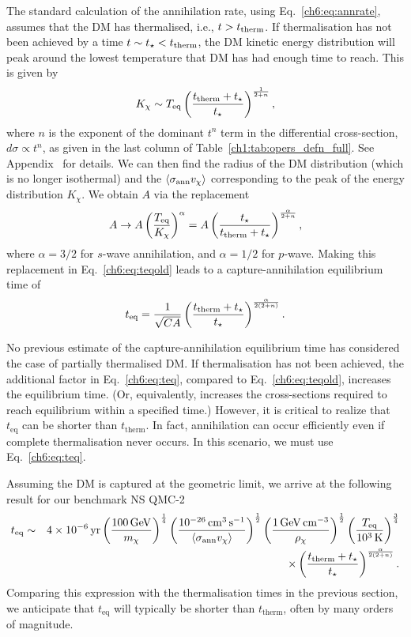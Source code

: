 The standard calculation of the annihilation rate, using Eq.~\ref{ch6:eq:annrate}, assumes that the DM has thermalised, i.e., $t > t_{\rm therm}$. 
If thermalisation has not been achieved by a time $t\sim t_\star<t_{\rm therm}$, the DM kinetic energy distribution will peak around the lowest temperature that DM has had enough time to reach. This is given by 
%
\begin{equation}
K_\chi \sim T_{\rm eq} \left(\frac{t_{\rm therm}+t_\star}{t_\star}\right)^{\frac{1}{2+n}},
\label{ch6:eq:lowtemp} 
\end{equation}
%
where $n$ is the exponent of the dominant $t^n$ term in the differential cross-section, $d\sigma \propto t^n$, as given in the last column of Table~\ref{ch1:tab:opers_defn_full}. See Appendix~ for details. 
We can then find the radius of the DM distribution (which is no longer isothermal) and the $\langle \sigma_{\rm ann} v_\chi \rangle$ corresponding to the peak of the energy distribution $K_\chi$. 
We obtain $A$ via the replacement  
%
\begin{equation}
    A \rightarrow A \left(\frac{T_\text{eq}}{K_\chi}\right)^{\alpha} = 
   A \left(\frac{t_\star}{t_\text{therm}+t_\star}\right)^{\frac{\alpha}{2+n}},  
\end{equation}
%
where $\alpha=3/2$ for $s$-wave annihilation, and $\alpha=1/2$ for $p$-wave. 
Making this replacement in Eq.~\ref{ch6:eq:teqold} leads to a capture-annihilation equilibrium time of
\begin{equation}
 t_{\rm eq} = \frac{1}{\sqrt{C A}} \left(\frac{t_\text{therm}+t_\star}{t_\star}\right)^{\frac{\alpha}{2(2+n)}}. \label{ch6:eq:teq} 
\end{equation}

No previous estimate of the capture-annihilation equilibrium time has considered the case of partially thermalised DM. If thermalisation has not been achieved, the additional factor in Eq.~\ref{ch6:eq:teq}, compared to Eq.~\ref{ch6:eq:teqold}, increases the equilibrium time. (Or, equivalently, increases the cross-sections required to reach equilibrium within a specified time.) However, it is critical to realize that $t_\text{eq}$ can be shorter than $t_\text{therm}$. 
In fact, annihilation can occur efficiently even if complete thermalisation never occurs. In this scenario, we must use Eq.~\ref{ch6:eq:teq}.



Assuming the DM is captured at the geometric limit, we arrive at the following result for our benchmark NS QMC-2
\begin{eqnarray}
    t_{\rm eq}  &\sim&  4\times10^{-6}{\rm \,yr}\left(\frac{100{\rm \,GeV}}{m_\chi}\right)^{\frac{1}{4}}\left(\frac{10^{-26}{\rm \,cm}^3 {\rm \,s}^{-1}}{\langle\sigma_\text{ann} v_\chi\rangle}\right)^{\frac{1}{2}} \left(\frac{1{\rm \,GeV}{\rm \,cm}^{-3}}{\rho_\chi}\right)^{\frac{1}{2}}\left(\frac{T_{\rm eq}}{10^3{\rm \,K}}\right)^{\frac{3}{4}} 
    \nonumber \\ &&\times
    \left(\frac{t_{\rm therm}+t_\star}{t_\star}\right)^{\frac{\alpha}{2(2+n)}}.
\end{eqnarray}
Comparing this expression with the thermalisation times in the previous section, we anticipate that  $t_\text{eq}$ will typically be shorter than $t_\text{therm}$, often by many orders of magnitude.




